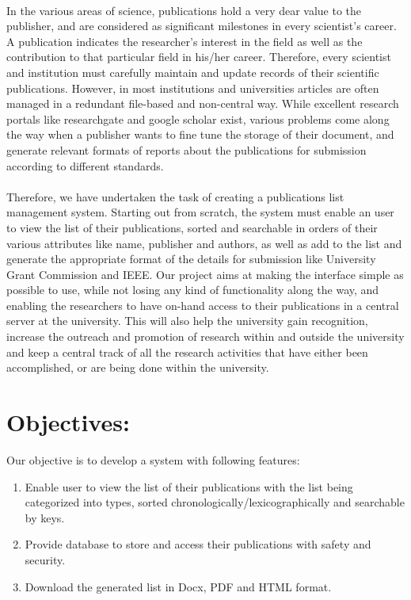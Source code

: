 \documentclass[12pt]{extarticle}
\begin{document}
	  \paragraph{}
	  In the various areas of science, publications hold a very dear value to the publisher, and are considered as significant milestones in every scientist’s career. A	publication	indicates the researcher’s interest in the field as well as the contribution to that particular field in his/her career. Therefore, every scientist and institution must	carefully maintain and update records of their scientific publications. However, in most	institutions and universities articles are often managed in a redundant file-based and	non-central way. While excellent research portals like researchgate and google scholar	exist, various problems come along the way when a publisher wants to fine tune the	storage of their document, and generate relevant formats of reports about the	publications for submission according to different standards. 

	\paragraph{}
	Therefore, we have	undertaken the task of creating a publications list management system. Starting out	from scratch, the system must enable an user to view the list of their publications, sorted	and searchable in orders of their various attributes like name, publisher and authors, as	well as add to the list and generate the appropriate format of the details for submission	like University Grant Commission and IEEE. Our project aims at making the interface	simple as possible to use, while not losing any kind of functionality along the way, and	enabling the researchers to have on-hand access to their publications in a central server	at the university. This will also help the university gain recognition, increase the	outreach and promotion of research within and outside the university and keep a	central track of all the research activities that have either been accomplished, or are	being done within the university.
	
	\section{Objectives:}
	Our objective is to develop a system with following features:
	\begin{enumerate}
		\item Enable user to view the list of their publications with the list being categorized into
		types, sorted chronologically/lexicographically and searchable by keys.
		\item Provide database to store and access their publications with safety and security.
		\item Download the generated list in Docx, PDF and HTML format.
	\end{enumerate}
\newpage
\end{document}
